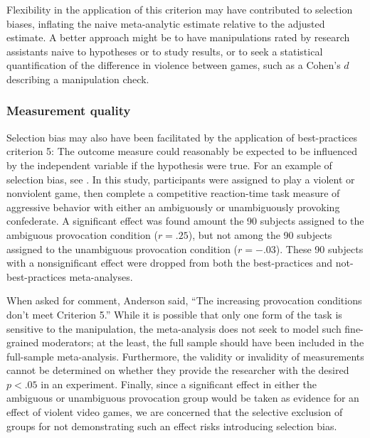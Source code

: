 \documentclass[man]{apa6}
\begin{document}
Flexibility in the application of this criterion may have contributed to selection biases, inflating the naive meta-analytic estimate relative to the adjusted estimate. A better approach might be to have manipulations rated by research assistants naive to hypotheses or to study results, or to seek a statistical quantification of the difference in violence between games, such as a Cohen's $d$ describing a manipulation check.

\subsubsection{Measurement quality}
Selection bias may also have been facilitated by the application of best-practices criterion 5: The outcome measure could reasonably be expected to be influenced by the independent variable if the hypothesis were true. For an example of selection bias, see \citet[study 2]{Anderson:etal:2004}. In this study, participants were assigned to play a violent or nonviolent game, then complete a competitive reaction-time task measure of aggressive behavior with either an ambiguously or unambiguously provoking confederate. A significant effect was found amount the 90  subjects assigned to the ambiguous provocation condition ($r = .25$), but not among the 90 subjects assigned to the unambiguous provocation condition ($r = -.03$). These 90 subjects with a nonsignificant effect were dropped from both the best-practices and not-best-practices meta-analyses. 

When asked for comment, Anderson said, ``The increasing provocation conditions don't meet Criterion 5.'' %
While it is possible that only one form of the task is sensitive to the manipulation, the meta-analysis does not seek to model such fine-grained moderators; at the least, the full sample should have been included in the full-sample meta-analysis. Furthermore, the validity or invalidity of measurements cannot be determined on whether they provide the researcher with the desired $p < .05$ in an experiment. Finally, since a significant effect in either the ambiguous or unambiguous provocation group would be taken as evidence for an effect of violent video games, we are concerned that the selective exclusion of groups for not demonstrating such an effect risks introducing selection bias.
\end{document}
